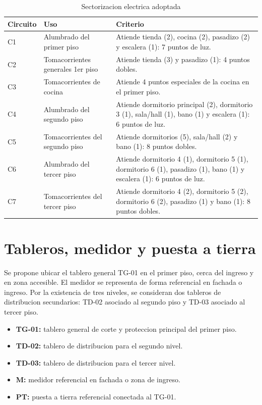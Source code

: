 \begin{table}[H]
\centering
\small
\caption{Sectorizacion electrica adoptada}
\label{tab:sectorizacion-adoptada}
\begin{tabularx}{\textwidth}{L{1.4cm}L{4.4cm}Y}
\toprule
\textbf{Circuito} & \textbf{Uso} & \textbf{Criterio} \\
\midrule
C1 & Alumbrado del primer piso & Atiende tienda (2), cocina (2), pasadizo (2) y escalera (1): 7 puntos de luz. \\
C2 & Tomacorrientes generales 1er piso & Atiende tienda (3) y pasadizo (1): 4 puntos dobles. \\
C3 & Tomacorrientes de cocina & Atiende 4 puntos especiales de la cocina en el primer piso. \\
C4 & Alumbrado del segundo piso & Atiende dormitorio principal (2), dormitorio 3 (1), sala/hall (1), bano (1) y escalera (1): 6 puntos de luz. \\
C5 & Tomacorrientes del segundo piso & Atiende dormitorios (5), sala/hall (2) y bano (1): 8 puntos dobles. \\
C6 & Alumbrado del tercer piso & Atiende dormitorio 4 (1), dormitorio 5 (1), dormitorio 6 (1), pasadizo (1), bano (1) y escalera (1): 6 puntos de luz. \\
C7 & Tomacorrientes del tercer piso & Atiende dormitorio 4 (2), dormitorio 5 (2), dormitorio 6 (2), pasadizo (1) y bano (1): 8 puntos dobles. \\
\bottomrule
\end{tabularx}
\end{table}

\section{Tableros, medidor y puesta a tierra}

Se propone ubicar el tablero general TG-01 en el primer piso, cerca del ingreso y en zona accesible. El medidor se representa de forma referencial en fachada o ingreso. Por la existencia de tres niveles, se consideran dos tableros de distribucion secundarios: TD-02 asociado al segundo piso y TD-03 asociado al tercer piso.

\begin{itemize}
  \item \textbf{TG-01:} tablero general de corte y proteccion principal del primer piso.
  \item \textbf{TD-02:} tablero de distribucion para el segundo nivel.
  \item \textbf{TD-03:} tablero de distribucion para el tercer nivel.
  \item \textbf{M:} medidor referencial en fachada o zona de ingreso.
  \item \textbf{PT:} puesta a tierra referencial conectada al TG-01.
\end{itemize}

